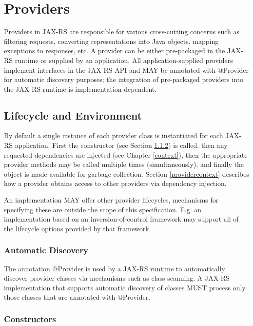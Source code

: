 \chapter{Providers}
\label{providers}

Providers in JAX-RS are responsible for various cross-cutting concerns such as filtering requests, converting
representations into Java objects, mapping exceptions to responses, etc. A provider can be either pre-packaged in the
JAX-RS runtime or supplied by an application. All application-supplied providers implement interfaces in the JAX-RS API
and MAY be annotated with @Provider for automatic discovery purposes; the integration of pre-packaged
providers into the JAX-RS runtime is implementation dependent.

\section{Lifecycle and Environment}
\label{lifecycle_and_environment}

By default a \textcolor{highlight green}{single} instance of each provider class is instantiated for each JAX-RS
application. First the constructor (see Section \ref{provider_class_constructor}) is called, then any requested
dependencies are injected (see Chapter \ref{context}), then the appropriate provider methods may be called multiple
times (simultaneously), and finally the object is made available for garbage collection. Section \ref{providercontext}
describes how a provider obtains access to other providers via dependency injection.

An implementation MAY offer other provider lifecycles, mechanisms for specifying these are outside the scope of this
specification. E.g. an implementation based on an inversion-of-control framework may support all of the lifecycle
options provided by that framework.

\subsection{Automatic Discovery}
\label{automatic_discovery}

The annotation @Provider is used by a JAX-RS runtime to automatically discover provider classes via
mechanisms such as class scanning. A JAX-RS implementation that supports automatic discovery of classes MUST process
only those classes that are annotated with @Provider.

\subsection{Constructors}
\label{provider_class_constructor}

